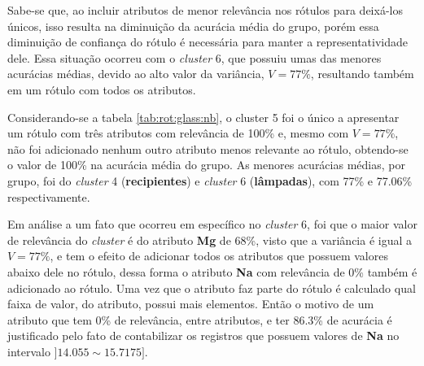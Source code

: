 Sabe-se que, ao incluir atributos de menor relevância nos rótulos para deixá-los únicos, isso resulta na diminuição da acurácia média do grupo, porém essa diminuição de confiança do rótulo é necessária para manter a representatividade dele. Essa situação ocorreu com o \textit{cluster} 6, que possuiu umas das menores acurácias médias, devido ao alto valor da variância, ${V=77\%}$, resultando também em um rótulo com todos os atributos. 

Considerando-se a tabela \ref{tab:rot:glass:nb}, o cluster 5 foi o único a apresentar um rótulo com três atributos com relevância de 100\% e, mesmo com ${V=77\%}$, não foi adicionado nenhum outro atributo menos relevante ao rótulo, obtendo-se o valor de 100\% na acurácia média do grupo. As menores acurácias médias, por grupo, foi do \textit{cluster} 4 (\textbf{recipientes}) e \textit{cluster} 6 (\textbf{lâmpadas}), com 77\% e 77.06\% respectivamente. 

Em análise a um fato que ocorreu em específico no \textit{cluster} 6, foi que o maior valor de relevância do \textit{cluster} é do atributo \textbf{Mg} de 68\%, visto que a variância é igual a ${V=77\%}$, e tem o efeito de adicionar todos os atributos que possuem valores abaixo dele no rótulo, dessa forma o atributo \textbf{Na} com relevância de 0\% também é adicionado ao rótulo. Uma vez que o atributo faz parte do rótulo é calculado  qual  faixa de valor, do atributo, possui mais elementos. Então o motivo de um atributo que tem 0\% de relevância, entre atributos, e ter 86.3\% de acurácia é justificado pelo fato de contabilizar os registros que possuem valores de \textbf{Na} no intervalo ${]14.055 \sim 15.7175 ]}$. 

